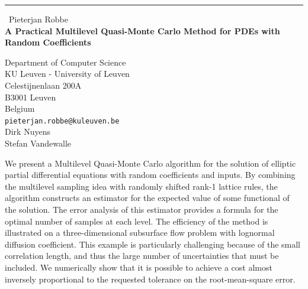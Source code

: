 \documentclass{report}
\begin{document}
\begin{center}
\rule{6in}{1pt} \
{\large Pieterjan Robbe \\
{\bf A Practical Multilevel Quasi-Monte Carlo Method for PDEs with Random Coefficients}}

Department of Computer Science \\ KU Leuven - University of Leuven \\ Celestijnenlaan 200A \\ B3001 Leuven \\ Belgium
\\
{\tt pieterjan.robbe@kuleuven.be}\\
Dirk Nuyens\\
Stefan Vandewalle\end{center}

We present a Multilevel Quasi-Monte Carlo algorithm for the solution of
elliptic partial differential equations with random coefficients and
inputs. By combining the multilevel sampling idea with randomly shifted
rank-1 lattice rules, the algorithm constructs an estimator for the
expected value of some functional of the solution. The error analysis of
this estimator provides a formula for the optimal number of samples at
each level. The efficiency of the method is illustrated on a
three-dimensional subsurface flow problem with lognormal diffusion
coefficient. This example is particularly challenging because of the
small correlation length, and thus the large number of uncertainties that
must be included. We numerically show that it is possible to achieve a
cost almost inversely proportional to the requested tolerance on the
root-mean-square error.
\end{document}
